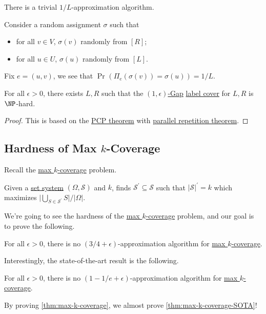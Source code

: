 \begin{remark}[Baseline]
	There is a trivial \(1/L\)-approximation algorithm.
\end{remark}
\begin{explanation}
	Consider a random assignment \(\sigma \) such that
	\begin{itemize}
		\item for all \(v\in V\), \(\sigma (v)\) randomly from \([R]\);
		\item for all \(u\in U\), \(\sigma (u)\) randomly from \([L]\).
	\end{itemize}
	Fix \(e=(u, v)\), we see that \(\Pr_{}(\Pi _e(\sigma (v)) = \sigma (u)) = 1 / L \).
\end{explanation}

\begin{theorem}\label{thm:label-cover}
	For all \(\epsilon > 0\), there exists \(L, R\) such that the \hyperref[def:c-s-Gap]{\((1, \epsilon )\)-Gap} \hyperref[prb:label-cover]{label cover} for \(L, R\) is \(\NP\)-hard.
\end{theorem}
\begin{proof}
	This is based on the \hyperref[thm:PCP]{PCP theorem} with \href{https://www.wisdom.weizmann.ac.il/~/ranraz/publications/Pparrepsur.pdf}{parallel repetition theorem}.
\end{proof}

\subsection{Hardness of Max \(k\)-Coverage}
Recall the \hyperref[prb:max-k-coverage]{max \(k\)-coverage} problem.

\begin{problem}\label{prb:max-k-coverage}
Given a \hyperref[def:set-system]{set system} \((\Omega , \mathcal{S}) \) and \(k\), finds \(\mathcal{S} ^\prime \subseteq \mathcal{S} \) such that \(\vert \mathcal{S}\vert ^\prime = k\) which maximizes \(\vert \bigcup_{S\in \mathcal{S} ^\prime } S \vert / \vert \Omega \vert \).
\end{problem}

We're going to see the hardness of the \hyperref[prb:max-k-coverage]{max \(k\)-coverage} problem, and our goal is to prove the following.

\begin{theorem}\label{thm:max-k-coverage}
	For all \(\epsilon >0\), there is no \((3 / 4 + \epsilon )\)-approximation algorithm for \hyperref[prb:max-k-coverage]{max \(k\)-coverage}.
\end{theorem}

Interestingly, the state-of-the-art result is the following.

\begin{theorem}\label{thm:max-k-coverage-SOTA}
	For all \(\epsilon >0\), there is no \((1 - 1/e + \epsilon )\)-approximation algorithm for \hyperref[prb:max-k-coverage]{max \(k\)-coverage}.
\end{theorem}

By proving \autoref{thm:max-k-coverage}, we almost prove \autoref{thm:max-k-coverage-SOTA}!